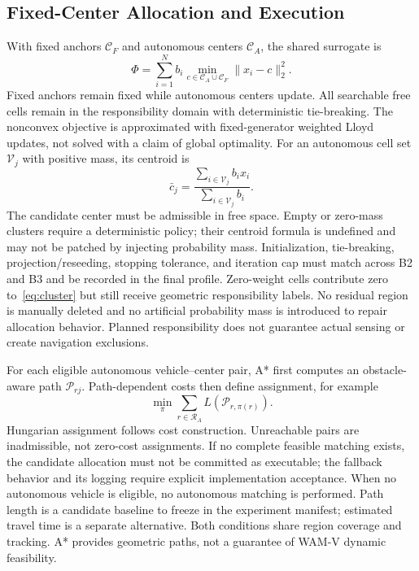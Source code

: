 \documentclass[conference]{IEEEtran}
\begin{document}
\subsection{Fixed-Center Allocation and Execution}
With fixed anchors $\mathcal C_F$ and autonomous centers $\mathcal C_A$, the shared surrogate is
\begin{equation}
 \Phi=\sum_{i=1}^N b_i\min_{c\in\mathcal C_A\cup\mathcal C_F}\|x_i-c\|_2^2.
\label{eq:cluster}
\end{equation}
Fixed anchors remain fixed while autonomous centers update. All searchable free cells remain in the responsibility domain with deterministic tie-breaking. The nonconvex objective is approximated with fixed-generator weighted Lloyd updates, not solved with a claim of global optimality. For an autonomous cell set $\mathcal V_j$ with positive mass, its centroid is
\begin{equation}
 \bar c_j=\frac{\sum_{i\in\mathcal V_j} b_i x_i}{\sum_{i\in\mathcal V_j}b_i}.
\end{equation}
The candidate center must be admissible in free space. Empty or zero-mass clusters require a deterministic policy; their centroid formula is undefined and may not be patched by injecting probability mass. Initialization, tie-breaking, projection/reseeding, stopping tolerance, and iteration cap must match across B2 and B3 and be recorded in the final profile. Zero-weight cells contribute zero to~\eqref{eq:cluster} but still receive geometric responsibility labels. No residual region is manually deleted and no artificial probability mass is introduced to repair allocation behavior. Planned responsibility does not guarantee actual sensing or create navigation exclusions.

For each eligible autonomous vehicle--center pair, A* first computes an obstacle-aware path $\mathcal P_{rj}$. Path-dependent costs then define assignment, for example
\begin{equation}
 \min_\pi\sum_{r\in\mathcal R_A} L(\mathcal P_{r,\pi(r)}).
\end{equation}
Hungarian assignment follows cost construction. Unreachable pairs are inadmissible, not zero-cost assignments. If no complete feasible matching exists, the candidate allocation must not be committed as executable; the fallback behavior and its logging require explicit implementation acceptance. When no autonomous vehicle is eligible, no autonomous matching is performed. Path length is a candidate baseline to freeze in the experiment manifest; estimated travel time is a separate alternative. Both conditions share region coverage and tracking. A* provides geometric paths, not a guarantee of WAM-V dynamic feasibility.
\end{document}
